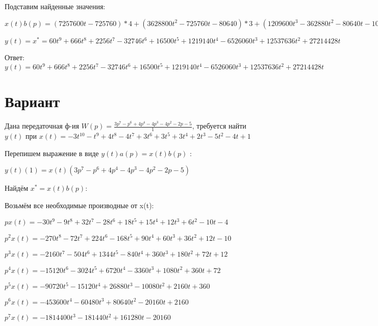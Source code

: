 \documentclass{article}
\begin{document}
{{{Подставим найденные значения:

$x(t)b(p) = (7257600t-725760)*4+(3628800t^{2}-725760t-80640)*3+(1209600t^{3}-362880t^{2}-80640t-10080)*(-5)+(302400t^{4}-120960t^{3}-40320t^{2}-10080t+1440)*4+(10080t^{6}-6048t^{5}-3360t^{4}-1680t^{3}+720t^{2}+480t-120)*(-3)+(1440t^{7}-1008t^{6}-672t^{5}-420t^{4}+240t^{3}+240t^{2}-120t+24)*2+(180t^{8}-144t^{7}-112t^{6}-84t^{5}+60t^{4}+80t^{3}-60t^{2}+24t+4)*4+(20t^{9}-18t^{8}-16t^{7}-14t^{6}+12t^{5}+20t^{4}-20t^{3}+12t^{2}+4t)*(-1)+(20t^{9}-18t^{8}-16t^{7}-14t^{6}+12t^{5}+20t^{4}-20t^{3}+12t^{2}+4t)*4=60t^{9}+666t^{8}+2256t^{7}-32746t^{6}+16500t^{5}+1219140t^{4}-6526060t^{3}+12537636t^{2}+27214428t$





$y(t)=x^*=60t^{9}+666t^{8}+2256t^{7}-32746t^{6}+16500t^{5}+1219140t^{4}-6526060t^{3}+12537636t^{2}+27214428t$

Ответ: $y(t) = 60t^{9}+666t^{8}+2256t^{7}-32746t^{6}+16500t^{5}+1219140t^{4}-6526060t^{3}+12537636t^{2}+27214428t$

\section{Вариант}

Дана передаточная ф-ия $W(p)=\frac{3p^{7}-p^{6}+4p^{4}-4p^{3}-4p^{2}-2p-5}{1}$, требуется найти $y(t)$ при $x(t)=-3t^{10}-t^{9}+4t^{8}-4t^{7}+3t^{6}+3t^{5}+3t^{4}+2t^{3}-5t^{2}-4t+1$

Перепишем выражение в виде $y(t)a(p)=x(t)b(p)$ :

$y(t)(1)=x(t)(3p^{7}-p^{6}+4p^{4}-4p^{3}-4p^{2}-2p-5)$

Найдём $x^*=x(t)b(p)$:

Возьмём все необходимые производные от x(t):

$px(t)=-30t^{9}-9t^{8}+32t^{7}-28t^{6}+18t^{5}+15t^{4}+12t^{3}+6t^{2}-10t-4$

$p^2x(t)=-270t^{8}-72t^{7}+224t^{6}-168t^{5}+90t^{4}+60t^{3}+36t^{2}+12t-10$

$p^3x(t)=-2160t^{7}-504t^{6}+1344t^{5}-840t^{4}+360t^{3}+180t^{2}+72t+12$

$p^4x(t)=-15120t^{6}-3024t^{5}+6720t^{4}-3360t^{3}+1080t^{2}+360t+72$

$p^5x(t)=-90720t^{5}-15120t^{4}+26880t^{3}-10080t^{2}+2160t+360$

$p^6x(t)=-453600t^{4}-60480t^{3}+80640t^{2}-20160t+2160$

$p^7x(t)=-1814400t^{3}-181440t^{2}+161280t-20160$

}}}
\end{document}

